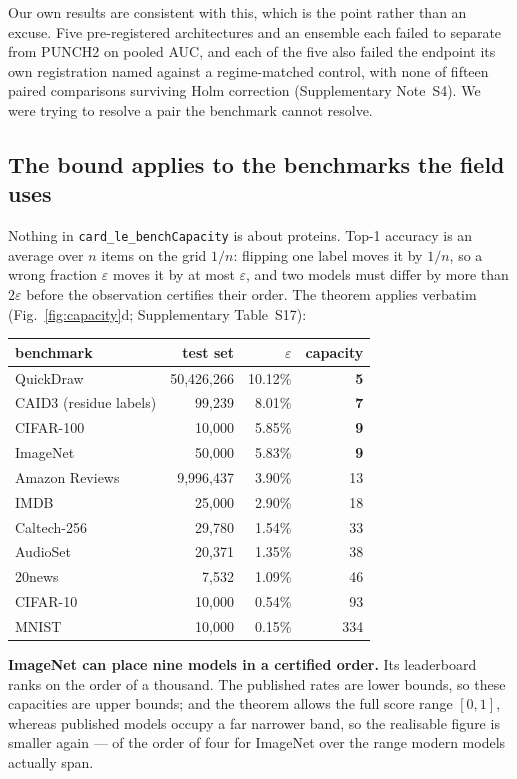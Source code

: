 \documentclass[11pt,a4paper]{article}
\newcommand{\eps}{\varepsilon}
\newcommand{\code}[1]{\texttt{\small #1}}
\begin{document}
Our own results are consistent with this, which is the point rather than an
excuse. Five pre-registered architectures and an ensemble each failed to
separate from PUNCH2 on pooled AUC, and each of the five also failed the
endpoint its own registration named against a regime-matched control, with none
of fifteen paired comparisons surviving Holm correction (Supplementary
Note~S4). We were trying to resolve a pair the benchmark cannot resolve.

\subsection*{The bound applies to the benchmarks the field uses}

Nothing in \code{card\_le\_benchCapacity} is about proteins. Top-1 accuracy is an
average over $n$ items on the grid $1/n$: flipping one label moves it by $1/n$,
so a wrong fraction $\eps$ moves it by at most $\eps$, and two models must
differ by more than $2\eps$ before the observation certifies their order. The
theorem applies verbatim (Fig.~\ref{fig:capacity}d; Supplementary Table~S17):

\begin{center}\small
\begin{tabular}{lrrr}
\toprule
benchmark & test set & $\eps$ & capacity \\
\midrule
QuickDraw & 50,426,266 & 10.12\% & \textbf{5} \\
CAID3 (residue labels) & 99,239 & 8.01\% & \textbf{7} \\
CIFAR-100 & 10,000 & 5.85\% & \textbf{9} \\
ImageNet & 50,000 & 5.83\% & \textbf{9} \\
Amazon Reviews & 9,996,437 & 3.90\% & 13 \\
IMDB & 25,000 & 2.90\% & 18 \\
Caltech-256 & 29,780 & 1.54\% & 33 \\
AudioSet & 20,371 & 1.35\% & 38 \\
20news & 7,532 & 1.09\% & 46 \\
CIFAR-10 & 10,000 & 0.54\% & 93 \\
MNIST & 10,000 & 0.15\% & 334 \\
\bottomrule
\end{tabular}
\end{center}

\noindent
\textbf{ImageNet can place nine models in a certified order.} Its leaderboard
ranks on the order of a thousand. The published rates are lower bounds, so these
capacities are upper bounds; and the theorem allows the full score range
$[0,1]$, whereas published models occupy a far narrower band, so the realisable
figure is smaller again --- of the order of four for ImageNet over the range
modern models actually span.
\end{document}
